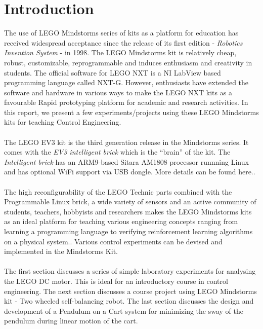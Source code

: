 \documentclass[paper=a4, fontsize=11pt]{scrartcl}
\numberwithin{equation}{section}        %
\numberwithin{figure}{section}          %
\numberwithin{table}{section}           %
\begin{document}
\section{Introduction}
The use of LEGO Mindstorms series of kits as a platform for education has received widespread acceptance since the release of its first edition - \emph{Robotics Invention System} - in 1998. The LEGO Mindstorms kit is relatively cheap, robust, customizable, reprogrammable and induces enthusiasm and creativity in students. The official software for LEGO NXT is a NI LabView based programming language called NXT-G. However, enthusiasts have extended the software and hardware in various ways to make the LEGO NXT kits as a favourable Rapid prototyping platform for academic and research activities. In this report, we present a few experiments/projects using these LEGO Mindstorms kits for teaching Control Engineering. 
\\~\\
The LEGO EV3 kit is the third generation release in the Mindstorms series. It comes with the \emph{EV3 intelligent brick} which is the ``brain'' of the kit. The \emph{Intelligent brick} has an ARM9-based Sitara AM1808 processor runnning Linux and has optional WiFi support via USB dongle. More details can be found here.\cite{Intro:EV3Web}.
\\~\\
The high reconfigurability of the LEGO Technic parts combined with the Programmable Linux brick, a wide variety of sensors and an active community of students, teachers, hobbyists and researchers makes the LEGO Mindstorms kits as an ideal platform for teaching various engineering concepts ranging from learning a programming language to verifying reinforcement learning algorithms on a physical system.\cite{Intro:NXT-G}\cite{Intro:RL}. Various control experiments can be devised and implemented in the Mindstorms Kit.
\\~\\
The first section discusses a series of simple laboratory experiments for analysing the LEGO DC motor. This is ideal for an introductory course in control engineering. The next section discusses a course project using LEGO Mindstorms kit - Two wheeled self-balancing robot. The last section discusses the design and development of a Pendulum on a Cart system for minimizing the sway of the pendulum during linear motion of the cart.

\pagebreak

\end{document}
